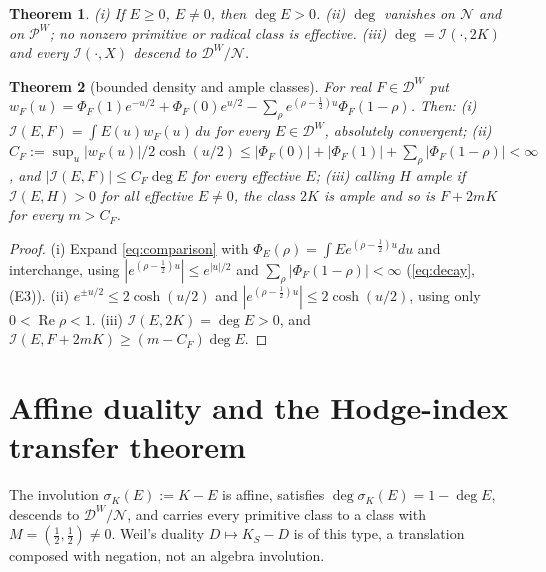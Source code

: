 \documentclass[11pt]{amsart}
\newtheorem{theorem}{Theorem}[section]
\theoremstyle{definition}
\theoremstyle{remark}
\newcommand{\Rel}{\operatorname{Re}}
\newcommand{\DW}{\mathcal D^{W}}
\newcommand{\PW}{\mathcal P^{W}}
\newcommand{\Nr}{\mathcal N}
\newcommand{\I}{\mathcal I}
\newcommand{\dg}{\deg}
\begin{document}
\begin{theorem}\label{thm:degree}
(i) If $E\ge0$, $E\ne0$, then $\dg E>0$. (ii) $\dg$ vanishes on $\Nr$ and on $\PW$; no nonzero primitive or
radical class is effective. (iii) $\dg=\I(\cdot,2K)$ and every $\I(\cdot,X)$ descend to $\DW/\Nr$.
\end{theorem}

\begin{theorem}[bounded density and ample classes]\label{thm:density}
For real $F\in\DW$ put $w_F(u)=\Phi_F(1)e^{-u/2}+\Phi_F(0)e^{u/2}-\sum_\rho e^{(\rho-\frac12)u}\Phi_F(1-\rho)$. Then:
(i) $\I(E,F)=\int E(u)w_F(u)\,du$ for every $E\in\DW$, absolutely convergent;
(ii) $C_F:=\sup_u|w_F(u)|/2\cosh(u/2)\le|\Phi_F(0)|+|\Phi_F(1)|+\sum_\rho|\Phi_F(1-\rho)|<\infty$, and
$|\I(E,F)|\le C_F\dg E$ for every effective $E$;
(iii) calling $H$ \emph{ample} if $\I(E,H)>0$ for all effective $E\ne0$, the class $2K$ is ample and so is
$F+2mK$ for every $m>C_F$.
\end{theorem}
\begin{proof}
(i) Expand \eqref{eq:comparison} with $\Phi_E(\rho)=\int Ee^{(\rho-\frac12)u}du$ and interchange, using
$|e^{(\rho-\frac12)u}|\le e^{|u|/2}$ and $\sum_\rho|\Phi_F(1-\rho)|<\infty$ (\eqref{eq:decay}, (E3)).
(ii) $e^{\pm u/2}\le2\cosh(u/2)$ and $|e^{(\rho-\frac12)u}|\le2\cosh(u/2)$, using only $0<\Rel\rho<1$.
(iii) $\I(E,2K)=\dg E>0$, and $\I(E,F+2mK)\ge(m-C_F)\dg E$.
\end{proof}

\section{Affine duality and the Hodge-index transfer theorem}\label{sec:transfer}

The involution $\sigma_K(E):=K-E$ is affine, satisfies $\dg\sigma_K(E)=1-\dg E$, descends to $\DW/\Nr$, and
carries every primitive class to a class with $M=(\frac12,\frac12)\ne0$. Weil's duality $D\mapsto K_S-D$ is of
this type, a translation composed with negation, not an algebra involution.
\end{document}
